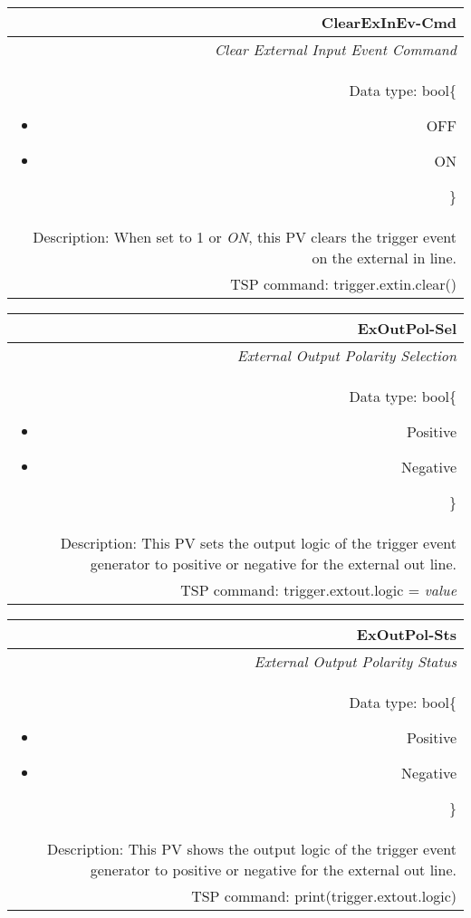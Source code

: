 \documentclass[openany]{article}
\begin{document}
		\begin{tabular}{N}
			\hline
			\bfseries ClearExInEv-Cmd\label{pv:clearexinev-cmd} \\ \hline
			\emph{Clear External Input Event Command} \\
			Data type: bool\{\begin{itemize}[noitemsep]
				\small
				\item[] OFF
				\item[] ON
			\end{itemize}\} \\
			Description: When set to 1 or \emph{ON}, this PV clears the trigger event on the external in line. \\
			TSP command: trigger.extin.clear()
		\end{tabular}

		\begin{tabular}{N}
			\hline
			\bfseries ExOutPol-Sel\label{pv:exoutpol-sel} \\ \hline
			\emph{External Output Polarity Selection} \\
			Data type: bool\{\begin{itemize}[noitemsep]
				\small
				\item[] Positive
				\item[] Negative
			\end{itemize}\} \\
			Description: This PV sets the output logic of the trigger event generator to positive or negative for the external out line. \\
			TSP command: trigger.extout.logic = \emph{value}
		\end{tabular}

		\begin{tabular}{N}
			\hline
			\bfseries ExOutPol-Sts\label{pv:exoutpol-sts} \\ \hline
			\emph{External Output Polarity Status} \\
			Data type: bool\{\begin{itemize}[noitemsep]
				\small
				\item[] Positive
				\item[] Negative
			\end{itemize}\} \\
			Description: This PV shows the output logic of the trigger event generator to positive or negative for the external out line. \\
			TSP command: print(trigger.extout.logic)
		\end{tabular}
\end{document}
